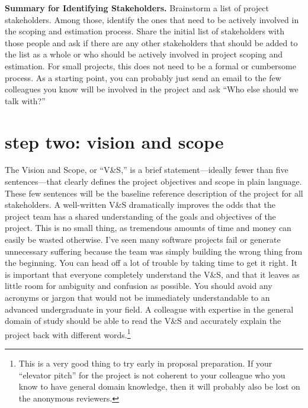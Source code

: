 \documentclass[12pt,oneside]{book}
\begin{document}
\hfill
\begin{mdframed}[everyline=true]
\textbf{Summary for Identifying Stakeholders.} Brainstorm a list of project stakeholders. Among those, identify the ones that need to be actively involved in the scoping and estimation process. Share the initial list of stakeholders with those people and ask if there are any other stakeholders that should be added to the list as a whole or who should be actively involved in project scoping and estimation. For small projects, this does not need to be a formal or cumbersome process. As a starting point, you can probably just send an email to the few colleagues you know will be involved in the project and ask ``Who else should we talk with?''
\end{mdframed}

\newpage
{}
\section*{step two: vision and scope}
\label{scrivauto:16}

The Vision and Scope, or ``V\&S,'' is a brief statement---ideally fewer than five sentences---that clearly defines the project objectives and scope in plain language. These few sentences will be the baseline reference description of the project for all stakeholders. A well-written V\&S dramatically improves the odds that the project team has a shared understanding of the goals and objectives of the project. This is no small thing, as tremendous amounts of time and money can easily be wasted otherwise. I've seen many software projects fail or generate unnecessary suffering because the team was simply building the wrong thing from the beginning. You can head off a lot of trouble by taking time to get it right. It is important that everyone completely understand the V\&S, and that it leaves as little room for ambiguity and confusion as possible. You should avoid any acronyms or jargon that would not be immediately understandable to an advanced undergraduate in your field. A colleague with expertise in the general domain of study should be able to read the V\&S and accurately explain the project back with different words.\footnote{
This is a very good thing to try early in proposal preparation. If your ``elevator pitch'' for the project is not coherent to your colleague who you know to have general domain knowledge, then it will probably also be lost on the anonymous reviewers.}
\end{document}
